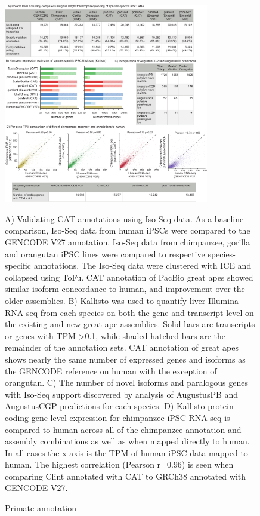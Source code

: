 \documentclass[fleqn,10pt]{wlscirep}
\begin{document}
\begin{figure}
\centering
\includegraphics[width=0.8\textwidth,height=0.8\textheight,keepaspectratio]{figure2-primate_v10.pdf}
\caption{Primate annotation}
A) Validating CAT annotations using Iso-Seq data. As a baseline comparison, Iso-Seq data from human iPSCs were compared to the GENCODE V27 annotation. Iso-Seq data from chimpanzee, gorilla and orangutan iPSC lines were compared to respective species-specific annotations. The Iso-Seq data were clustered with ICE and collapsed using ToFu\cite{gordon2015widespread}. CAT annotation of PacBio great apes showed similar isoform concordance to human, and improvement over the older assemblies. B) Kallisto\cite{bray2015near} was used to quantify liver Illumina RNA-seq from each species on both the gene and transcript level on the existing and new great ape assemblies. Solid bars are transcripts or genes with TPM \textgreater 0.1, while shaded hatched bars are the remainder of the annotation sets. CAT annotation of great apes shows nearly the same number of expressed genes and isoforms as the GENCODE reference on human with the exception of orangutan. C) The number of novel isoforms and paralogous genes with Iso-Seq support discovered by analysis of AugustusPB and AugustusCGP predictions for each species. D) Kallisto protein-coding gene-level expression for chimpanzee iPSC RNA-seq is compared to human across all of the chimpanzee annotation and assembly combinations as well as when mapped directly to human. In all cases the x-axis is the TPM of human iPSC data mapped to human. The highest correlation (Pearson r=0.96) is seen when comparing Clint annotated with CAT to GRCh38 annotated with GENCODE V27.
\label{fig:primate}
\end{figure}
\end{document}
